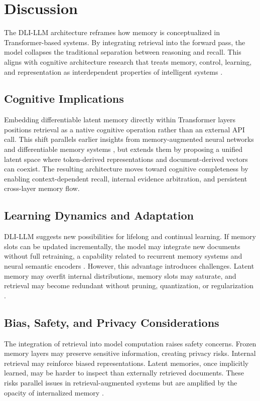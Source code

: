 
\clearpage

\section{Discussion}
The DLI-LLM architecture reframes how memory is conceptualized in Transformer-based systems. By integrating retrieval into the forward pass, the model collapses the traditional separation between reasoning and recall. This aligns with cognitive architecture research that treats memory, control, learning, and representation as interdependent properties of intelligent systems \cite{Sun2004}.

\subsection{Cognitive Implications}
Embedding differentiable latent memory directly within Transformer layers positions retrieval as a native cognitive operation rather than an external API call. This shift parallels earlier insights from memory-augmented neural networks and differentiable memory systems \cite{Graves2014, Graves2016, Santoro2016}, but extends them by proposing a unified latent space where token-derived representations and document-derived vectors can coexist. The resulting architecture moves toward cognitive completeness by enabling context-dependent recall, internal evidence arbitration, and persistent cross-layer memory flow.

\subsection{Learning Dynamics and Adaptation}
DLI-LLM suggests new possibilities for lifelong and continual learning. If memory slots can be updated incrementally, the model may integrate new documents without full retraining, a capability related to recurrent memory systems and neural semantic encoders \cite{Bulatov2022, Munkhdalai2017}. However, this advantage introduces challenges. Latent memory may overfit internal distributions, memory slots may saturate, and retrieval may become redundant without pruning, quantization, or regularization \cite{Jgou2011, Johnson2021}.

\subsection{Bias, Safety, and Privacy Considerations}
The integration of retrieval into model computation raises safety concerns. Frozen memory layers may preserve sensitive information, creating privacy risks. Internal retrieval may reinforce biased representations. Latent memories, once implicitly learned, may be harder to inspect than externally retrieved documents. These risks parallel issues in retrieval-augmented systems but are amplified by the opacity of internalized memory \cite{Lewis2021}.

